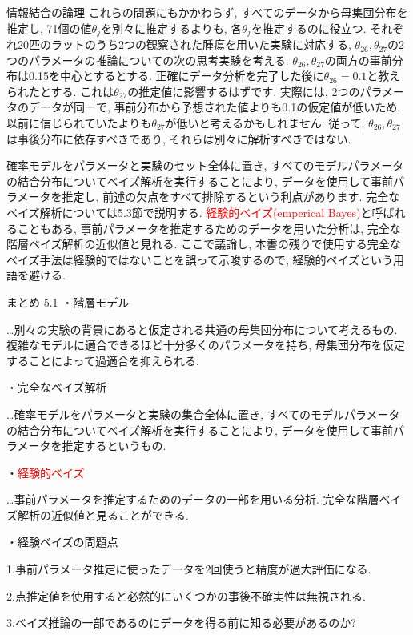 \documentclass[10pt,dvipdfmx,a4]{beamer}
\newcommand{\tcr}[1]{\textcolor{red}{#1}}
\begin{document}
\begin{frame}{情報結合の論理}
これらの問題にもかかわらず, すべてのデータから母集団分布を推定し, 71個の値$\theta_j$を別々に推定するよりも, 各$\theta_j$を推定するのに役立つ.
それぞれ20匹のラットのうち2つの観察された腫瘍を用いた実験に対応する, $\theta_{26}, \theta_{27}$の2つのパラメータの推論についての次の思考実験を考える.
$\theta_{26}, \theta_{27}$の両方の事前分布は0.15を中心とするとする.
正確にデータ分析を完了した後に$\theta_{26}= 0.1$と教えられたとする.
これは$\theta_{27}$の推定値に影響するはずです.
実際には, 2つのパラメータのデータが同一で, 事前分布から予想された値よりも0.1の仮定値が低いため, 以前に信じられていたよりも$\theta_{27}$が低いと考えるかもしれません.
従って, $\theta_{26}, \theta_{27}$は事後分布に依存すべきであり, それらは別々に解析すべきではない.

確率モデルをパラメータと実験のセット全体に置き, すべてのモデルパラメータの結合分布についてベイズ解析を実行することにより, データを使用して事前パラメータを推定し, 前述の欠点をすべて排除するという利点があります.
完全なベイズ解析については5.3節で説明する.
\tcr{経験的ベイズ(emperical Bayes)}と呼ばれることもある, 事前パラメータを推定するためのデータを用いた分析は, 完全な階層ベイズ解析の近似値と見れる.
ここで議論し, 本書の残りで使用する完全なベイズ手法は経験的ではないことを誤って示唆するので, 経験的ベイズという用語を避ける.
\end{frame}


\begin{frame}{まとめ 5.1}
・階層モデル

…別々の実験の背景にあると仮定される共通の母集団分布について考えるもの.
複雑なモデルに適合できるほど十分多くのパラメータを持ち, 母集団分布を仮定することによって過適合を抑えられる.

・完全なベイズ解析

…確率モデルをパラメータと実験の集合全体に置き, すべてのモデルパラメータの結合分布についてベイズ解析を実行することにより, データを使用して事前パラメータを推定するというもの.

・\tcr{経験的ベイズ}

…事前パラメータを推定するためのデータの一部を用いる分析.
完全な階層ベイズ解析の近似値と見ることができる.

・経験ベイズの問題点

1.事前パラメータ推定に使ったデータを2回使うと精度が過大評価になる.

2.点推定値を使用すると必然的にいくつかの事後不確実性は無視される.

3.ベイズ推論の一部であるのにデータを得る前に知る必要があるのか?
\end{frame}
\end{document}
